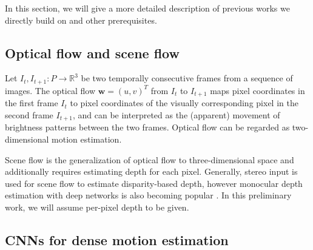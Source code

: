 In this section, we will give a more detailed description of previous works
we directly build on and other prerequisites.

\subsection{Optical flow and scene flow}
Let $I_t,I_{t+1} : P \to \mathbb{R}^3$ be two temporally consecutive frames from a
sequence of images.
The optical flow
$\mathbf{w} = (u, v)^T$ from $I_t$ to $I_{t+1}$
maps pixel coordinates in the first frame $I_t$ to pixel coordinates of the
visually corresponding pixel in the second frame $I_{t+1}$,
and can be interpreted as the (apparent) movement of brightness patterns between the two frames.
Optical flow can be regarded as two-dimensional motion estimation.

Scene flow is the generalization of optical flow to three-dimensional space and additionally
requires estimating depth for each pixel. Generally, stereo input is used for scene flow
to estimate disparity-based depth, however monocular depth estimation with deep networks is also becoming
popular \cite{DeeperDepth, UnsupPoseDepth}.
In this preliminary work, we will assume per-pixel depth to be given.

\subsection{CNNs for dense motion estimation}

